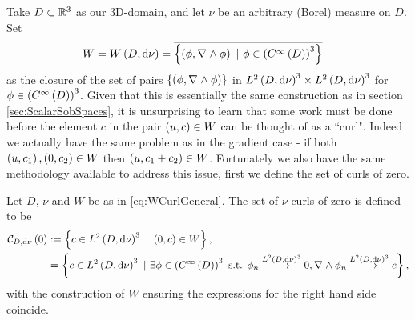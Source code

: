 Take $D\subset\mathbb{R}^3$ as our 3D-domain, and let $\nu$ be an arbitrary (Borel) measure on $D$.
Set 
\begin{align} \label{eq:WCurlGeneral}
	W &= W\left( D,\mathrm{d}\nu \right) = \overline{ \left\{  \left( \phi, \nabla_{}\wedge\phi \right) \ \vert \ \phi\in\left( C^{\infty}\left( D \right) \right)^3  \right\} }
\end{align}
as the closure of the set of pairs $\left\{ \left( \phi, \nabla_{}\wedge\phi \right) \right\}$ in $L^{2}\left( D,\mathrm{d}\nu \right)^3\times L^{2}\left( D,\mathrm{d}\nu \right)^3$ for $\phi\in\left( C^{\infty}\left( D \right) \right)^3$.
Given that this is essentially the same construction as in section \ref{sec:ScalarSobSpaces}, it is unsurprising to learn that some work must be done before the element $c$ in the pair $\left( u,c \right)\in W$ can be thought of as a ``curl".
Indeed we actually have the same problem as in the gradient case - if both $\left( u,c_1 \right), \left( 0, c_2 \right)\in W$ then $\left( u,c_1+c_2 \right)\in W$.
Fortunately we also have the same methodology available to address this issue, first we define the set of curls of zero.
\begin{definition} \label{def:CurlZeroGeneral}
	Let $D$, $\nu$ and $W$ be as in \eqref{eq:WCurlGeneral}.
	The set of $\nu$-curls of zero is defined to be
	\begin{align*}
		\curlZero{D}{\nu} &:= \clbracs{ c\in\ltwo{D}{\nu}^3 \ \vert \ \bracs{0,c}\in W }, \\
		&= \clbracs{ c\in\ltwo{D}{\nu}^3 \ \vert \ \exists\phi\in\bracs{\smooth{D}}^3 \text{ s.t. } \phi_n\lconv{\ltwo{D}{\nu}^3}0, \curl{}\phi_n\lconv{\ltwo{D}{\nu}^3}c },
	\end{align*}
	with the construction of $W$ ensuring the expressions for the right hand side coincide.
\end{definition}

